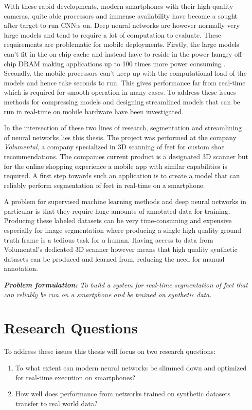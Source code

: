 \documentclass{kththesis}
\begin{document}
With these rapid developments, modern smartphones with their high quality
cameras, quite able processors and immense availability have become a sought
after target to run CNN:s on. Deep neural networks are however normally very
large models and tend to require a lot of computation to evaluate. These
requirements are problematic for mobile deployments. Firstly, the large
models can't fit in the on-chip cache and instead have to reside in the power
hungry off-chip DRAM making applications up to 100 times more power consuming
\parencite{han2015learning}. Secondly, the mobile processors can't keep up with
the computational load of the models and hence take seconds to run. This gives
performance far from real-time which is required for smooth operation in many
cases. To address these issues methods for compressing models and designing
streamlined models that can be run in real-time on mobile hardware have been
investigated.

In the intersection of these two lines of research, segmentation and
streamlining of neural networks lies this thesis. The project was performed at
the company \textit{Volumental}, a company specialized in 3D scanning of feet
for custom shoe recommendations. The companies current product is a designated
3D scanner but for the online shopping experience a mobile app with similar
capabilities is required. A first step towards such an application is to create
a model that can reliably perform segmentation of feet in real-time on a
smartphone.

A problem for supervised machine learning methods and deep neural networks in
particular is that they require huge amounts of annotated data for training.
Producing these labeled datasets can be very time-consuming and expensive
especially for image segmentation where producing a single high quality
ground truth frame is a tedious task for a human. Having access to data from
Volumental's dedicated 3D scanner however means that high quality synthetic
datasets can be produced and learned from, reducing the need for manual annotation.

\textit{\textbf{Problem formulation:} To build a system for real-time segmentation of feet that can reliably be run on a
  smartphone and be trained on synthetic data.}
\section{Research Questions}
To address these issues this thesis will focus on two research questions:
\begin{enumerate}
\item To what extent can modern neural networks be slimmed down and optimized for
  real-time execution on smartphones?
\item How well does performance from networks trained on synthetic datasets
  transfer to real world data? 
\end{enumerate}
  
\end{document}
